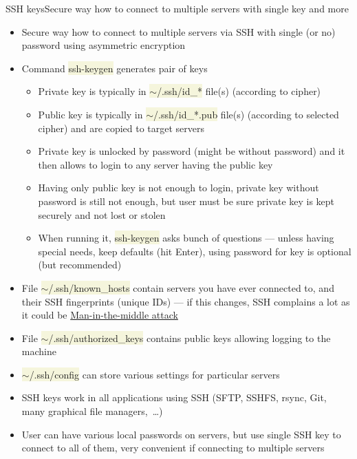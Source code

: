 \documentclass[compress, xelatex, 11pt, xcolor=svgnames, aspectratio=169,
	hyperref={
		bookmarks=true,
		unicode=true,
		colorlinks=true,
		pdftitle={Linux, command line and MetaCentrum},
		plainpages=false,
		pdfauthor={Vojtech Zeisek},
		pdfsubject={Course about use of Linux command line, writing shell scripts and using MetaCentrum of CESNET},
		pdfcreator={XeLaTeX},
		pdfkeywords={Linux, GNU, BASH, shell, command line, MetaCentrum},
		linkcolor=DarkRed, %
		anchorcolor=DarkBlue, %
		citecolor=Indigo, %
		filecolor=NavyBlue, %
		menucolor=DarkMagenta, %
		urlcolor=DarkBlue, %
		},
	url={hyphens, lowtilde} %
	]{beamer}
\renewcommand{\texttt}[1]{\colorbox{Beige}{{\ttfamily #1}}}
\begin{document}
\begin{frame}[allowframebreaks]{SSH keys}{Secure way how to connect to multiple servers with single key and more}
	\begin{itemize}
		\item Secure way how to connect to multiple servers via SSH with single (or no) password using asymmetric encryption
		\item Command \texttt{ssh-keygen} generates pair of keys
		\begin{itemize}
			\item Private key is typically in \texttt{$\sim$/.ssh/id\_*} file(s) (according to cipher)
			\item Public key is typically in \texttt{$\sim$/.ssh/id\_*.pub} file(s) (according to selected cipher) and are copied to target servers
			\item Private key is unlocked by password (might be without password) and it then allows to login to any server having the public key
			\item Having only public key is not enough to login, private key without password is still not enough, but user must be sure private key is kept securely and not lost or stolen
			\item When running it, \texttt{ssh-keygen} asks bunch of questions --- unless having special needs, keep defaults (hit Enter), using password for key is optional (but recommended)
		\end{itemize}
		\item File \texttt{$\sim$/.ssh/known\_hosts} contain servers you have ever connected to, and their SSH fingerprints (unique IDs) --- if this changes, SSH complains a lot as it could be \href{https://en.wikipedia.org/wiki/Man-in-the-middle_attack}{Man-in-the-middle attack}
		\item File \texttt{$\sim$/.ssh/authorized\_keys} contains public keys allowing logging to the machine
		\item \texttt{$\sim$/.ssh/config} can store various settings for particular servers
		\item SSH keys work in all applications using SSH (SFTP, SSHFS, rsync, Git, many graphical file managers,~\ldots)
		\item User can have various local passwords on servers, but use single SSH key to connect to all of them, very convenient if connecting to multiple servers
	\end{itemize}
\end{frame}
\end{document}

